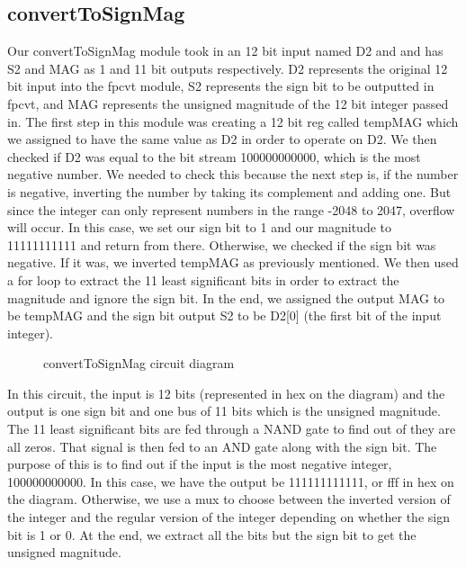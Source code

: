 \documentclass{article}
\begin{document}
\subsection*{convertToSignMag}
Our convertToSignMag module took in an 12 bit input named D2 and and has S2 and MAG as 1 and 11 bit outputs respectively. D2 represents the original 12 bit input into the fpcvt module, S2 represents the sign bit to be outputted in fpcvt, and MAG represents the unsigned magnitude of the 12 bit integer passed in. The first step in this module was creating a 12 bit reg called tempMAG which we assigned to have the same value as D2 in order to operate on D2. We then checked if D2 was equal to the bit stream 100000000000, which is the most negative number. We needed to check this because the next step is, if the number is negative, inverting the number by taking its complement and adding one. But since the integer can only represent numbers in the range -2048 to 2047, overflow will occur. In this case, we set our sign bit to 1 and our magnitude to 11111111111 and return from there. Otherwise, we checked if the sign bit was negative. If it was, we inverted tempMAG as previously mentioned. We then used a for loop to extract the 11 least significant bits in order to extract the magnitude and ignore the sign bit. In the end, we assigned the output MAG to be tempMAG and the sign bit output S2 to be D2[0] (the first bit of the input integer).

\begin{figure}[H]
	\begin{center}
		\caption{convertToSignMag circuit diagram}
	\end{center}
\end{figure}

In this circuit, the input is 12 bits (represented in hex on the diagram) and the output is one sign bit and one bus of 11 bits which is the unsigned magnitude. The 11 least significant bits are fed through a NAND gate to find out of they are all zeros. That signal is then fed to an AND gate along with the sign bit. The purpose of this is to find out if the input is the most negative integer, 100000000000. In this case, we have the output be 111111111111, or fff in hex on the diagram. Otherwise, we use a mux to choose between the inverted version of the integer and the regular version of the integer depending on whether the sign bit is 1 or 0. At the end, we extract all the bits but the sign bit to get the unsigned magnitude.
\end{document}

